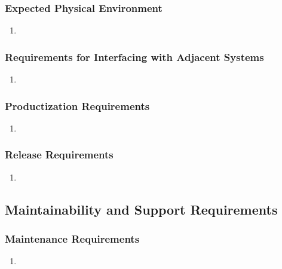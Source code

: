 \documentclass[]{article}
\begin{document}
\subsubsection{Expected Physical Environment}
\label{ssub:expected_physical_environment}
\begin{enumerate}[{OE}1. ]
	\item 
\end{enumerate}

\subsubsection{Requirements for Interfacing with Adjacent Systems}
\label{ssub:requirements_for_interfacing_with_adjacent_systems}
\begin{enumerate}[{OE}1. ]
	\item 
\end{enumerate}

\subsubsection{Productization Requirements}
\label{ssub:productization_requirements}
\begin{enumerate}[{OE}1. ]
	\item 
\end{enumerate}

\subsubsection{Release Requirements}
\label{ssub:release_requirements}
\begin{enumerate}[{OE}1. ]
	\item 
\end{enumerate}


\subsection{Maintainability and Support Requirements}
\label{sub:maintainability_and_support_requirements}

\subsubsection{Maintenance Requirements}
\label{ssub:maintenance_requirements}
\begin{enumerate}[{MS}1. ]
	\item 
\end{enumerate}
\end{document}
